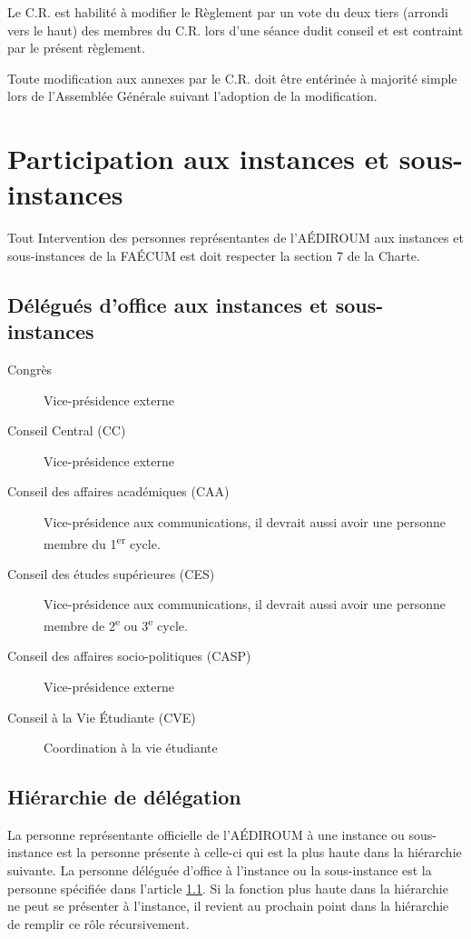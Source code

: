 \documentclass{aediroum}
\newcommand{\article}[1]{article \ref{#1}}
\begin{document}
Le C.R. est habilité à modifier le Règlement par un vote du deux tiers (arrondi vers le haut) des membres du C.R. lors d'une séance dudit conseil et est contraint par le présent règlement.

Toute modification aux annexes par le C.R. doit être entérinée à majorité simple lors de l'Assemblée Générale suivant l'adoption de la modification.

\section{Participation aux instances et sous-instances}\label{sec:hierarchie-delegues-faecum}

Tout Intervention des personnes représentantes de l'AÉDIROUM aux instances et sous-instances de la FAÉCUM est doit respecter la section 7 de la Charte.

\subsection{Délégués d'office aux instances et sous-instances}\label{sec:delegues-doffice-instances}
\begin{description}
\item[Congrès] Vice-présidence externe
\item[Conseil Central (CC)] Vice-présidence externe
\item[Conseil des affaires académiques (CAA)] Vice-présidence aux communications, il devrait aussi avoir une personne membre du 1\textsuperscript{er} cycle.
\item[Conseil des études supérieures (CES)] Vice-présidence aux communications, il devrait aussi avoir une personne membre de 2\textsuperscript{e} ou 3\textsuperscript{e} cycle.
\item[Conseil des affaires socio-politiques (CASP)] Vice-présidence externe
\item[Conseil à la Vie Étudiante (CVE)] Coordination à la vie étudiante
\end{description}

\subsection{Hiérarchie de délégation}\label{sec:hierarchie-delegues-faecum}

La personne représentante officielle de l'AÉDIROUM à une instance ou sous-instance est la personne présente à celle-ci qui est la plus haute dans la hiérarchie suivante. La personne déléguée d'office à l'instance ou la sous-instance est la personne spécifiée dans l'\article{sec:delegues-doffice-instances}. Si la fonction plus haute dans la hiérarchie ne peut se présenter à l'instance, il revient au prochain point dans la hiérarchie de remplir ce rôle récursivement.
\end{document}

